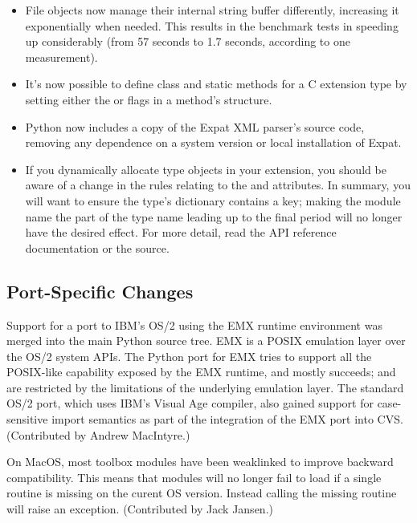 \documentclass{howto}
\begin{document}
\begin{itemize}
\item File objects now manage their internal string buffer
differently, increasing it exponentially when needed.  This results in
the benchmark tests in  speeding up
considerably (from 57 seconds to 1.7 seconds, according to one
measurement).

\item It's now possible to define class and static methods for a C
extension type by setting either the  or
 flags in a method's 
structure.

\item Python now includes a copy of the Expat XML parser's source code,
removing any dependence on a system version or local installation of
Expat.

\item If you dynamically allocate type objects in your extension, you
should be aware of a change in the rules relating to the
 and  attributes.  In summary,
you will want to ensure the type's dictionary contains a
 key; making the module name the part of the type
name leading up to the final period will no longer have the desired
effect.  For more detail, read the API reference documentation or the 
source.

\end{itemize}


\subsection{Port-Specific Changes}

Support for a port to IBM's OS/2 using the EMX runtime environment was
merged into the main Python source tree.  EMX is a POSIX emulation
layer over the OS/2 system APIs.  The Python port for EMX tries to
support all the POSIX-like capability exposed by the EMX runtime, and
mostly succeeds;  and  are
restricted by the limitations of the underlying emulation layer.  The
standard OS/2 port, which uses IBM's Visual Age compiler, also gained
support for case-sensitive import semantics as part of the integration
of the EMX port into CVS.  (Contributed by Andrew MacIntyre.)

On MacOS, most toolbox modules have been weaklinked to improve
backward compatibility.  This means that modules will no longer fail
to load if a single routine is missing on the curent OS version.
Instead calling the missing routine will raise an exception.
(Contributed by Jack Jansen.)
\end{document}

